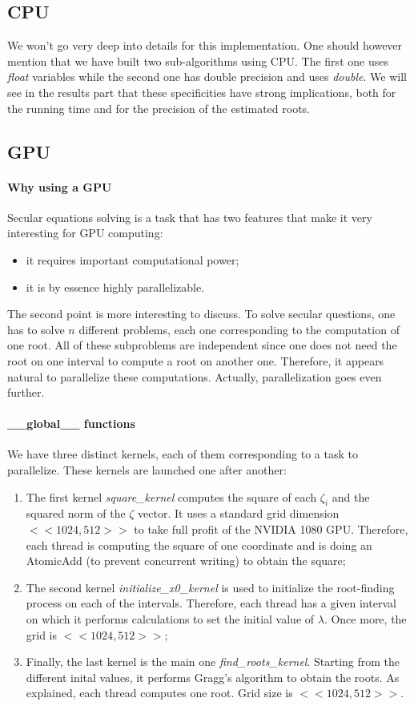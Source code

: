 \documentclass[10pt,a4paper]{article}
\begin{document}
\subsection{CPU}
We won't go very deep into details for this implementation. One should however mention that we have built two sub-algorithms using CPU. The first one uses \textit{float} variables while the second one has double precision and uses \textit{double}. We will see in the results part that these specificities have strong implications, both for the running time and for the precision of the estimated roots.

\subsection{GPU}
\paragraph{Why using a GPU}
Secular equations solving is a task that has two features that make it very interesting for GPU computing:
\begin{itemize}
    \item it requires important computational power;
    \item it is by essence highly parallelizable. 
\end{itemize}
The second point is more interesting to discuss. To solve secular questions, one has to solve $n$ different problems, each one corresponding to the computation of one root. All of these subproblems are independent since one does not need the root on one interval to compute a root on another one. Therefore, it appears natural to parallelize these computations. Actually, parallelization goes even further.\\

\paragraph{\_\_global\_\_ functions} We have three distinct kernels, each of them corresponding to a task to parallelize. These kernels are launched one after another:
\begin{enumerate}
    \item The first kernel \textit{square\_kernel} computes the square of each $\zeta_i$ and the squared norm of the $\zeta$ vector. It uses a standard grid dimension $<<1024,512>>$ to take full profit of the NVIDIA 1080 GPU. Therefore, each thread is computing the square of one coordinate and is doing an AtomicAdd (to prevent concurrent writing) to obtain the square;
    \item The second kernel \textit{initialize\_x0\_kernel} is used to initialize the root-finding process on each of the intervals. Therefore, each thread has a given interval on which it performs calculations to set the initial value of $\lambda$. Once more, the grid is $<<1024,512>>$;
    \item Finally, the last kernel is the main one \textit{find\_roots\_kernel}. Starting from the different inital values, it performs Gragg's algorithm to obtain the roots. As explained, each thread computes one root. Grid size is $<<1024,512>>$. 
\end{enumerate}
\end{document}
